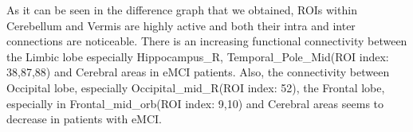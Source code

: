 \documentclass[journal]{IEEEtran}
\begin{document}
	As it can be seen in the difference graph that we obtained, ROIs within Cerebellum and Vermis are highly active and both their intra and inter connections are noticeable. There is an increasing functional connectivity between the Limbic lobe especially 
	Hippocampus\_R, Temporal\_Pole\_Mid(ROI index: 38,87,88)
	and Cerebral areas in eMCI patients. Also, the connectivity between Occipital lobe, especially Occipital\_mid\_R(ROI index: 52), the Frontal lobe, especially in Frontal\_mid\_orb(ROI index: 9,10) and Cerebral areas seems to decrease in patients with eMCI.
	
	
	
	
\end{document}
